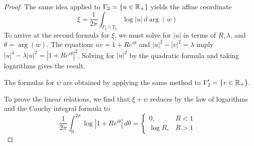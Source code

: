 \documentclass[12pt]{amsart}
\begin{document}
\begin{proof}
  The same idea applied to $\Gamma_2 = \{u \in \mathbb{R}_+\}$ yields the affine coordinate 
\begin{equation}
\xi = \frac{1}{2\pi} \int_{\Gamma_2 \cap T_b} \log|u|\,d\arg(w)
\end{equation}
To arrive at the second formula for $\xi$, we must solve for $|u|$
  in terms of $R,\lambda$, and $\theta = \arg(w)$. The equations $uv =
  1 + Re^{i\theta}$ and $|u|^2 - |v|^2 = \lambda$ imply $|u|^4 -
  \lambda|u|^2 = |1+Re^{i\theta}|^2$. Solving for $|u|^2$ by the
  quadratic formula and taking logarithms gives the result.

The formulas for $\psi$ are obtained by applying the same method to $\Gamma'_2 = \{v \in \mathbb{R}_+\}$. 




  To prove the linear relations, we find that $\xi + \psi$ reduces by the law of logarithms and the Cauchy integral formula to
  \begin{equation}
    \frac{1}{2\pi}\int_0^{2\pi} \log|1+Re^{i\theta}|\,d\theta = \begin{cases}0, & R<1\\ \log R, &R > 1\end{cases}
  \end{equation}

\end{proof}
\end{document}
